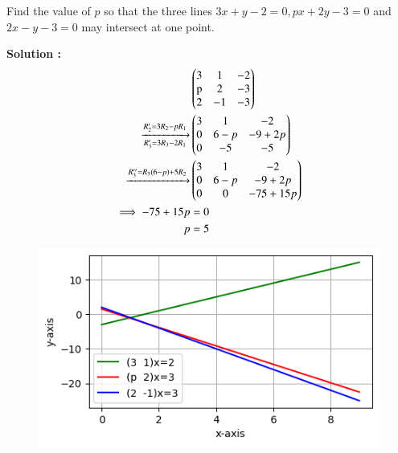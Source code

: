 Find the value of $p$ so that the three lines $3x+y-2=0,px+2y-3=0$ and $2x-y-3=0$ may intersect at one point.


\textbf{Solution :}
\begin{align}  
&\myvec{
    3 &1&-2 \\
     $p$&2&-3\\
     2&-1&-3
}\\
\xrightarrow[R_3'=3R_3-2R_1]{R_2'=3R_2-pR_1}&\myvec{
    3&1&-2\\
     $0$&6-p&-9+2p\\
     0&-5&-5}\\
 \xrightarrow{R_3''=R_3(6-p)+5R_2}&\myvec{
    3&1&-2\\
     0&6-p&-9+2p\\
     0&0&-75+15p}\\
  \implies -75+15p&=0\\
    p&=5
\end{align}

\begin{figure}[H]
    \centering
    \includegraphics[width=\columnwidth]{chapters/11/10/4/9/fig/11.10.4.9.png}
    \caption{}
    \label{11.10.4.9}
\end{figure}

